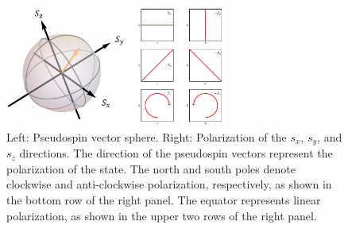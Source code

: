 %
\begin{figure}[ht]
    \centering
    \includegraphics[width=0.65\textwidth]{Fig/Ch1/polarization_all.pdf}
    \caption[Pseudospin vector sphere]{Left: Pseudospin vector sphere. Right: Polarization of the $s_x$, $s_y$, and $s_z$ directions. The direction of the pseudospin vectors represent the polarization of the state. The north and south poles denote clockwise and anti-clockwise polarization, respectively, as shown in the bottom row of the right panel. The equator represents linear polarization, as shown in the upper two rows of the right panel.}
    \label{fig:Ch1_pseudospin}
\end{figure}
%

